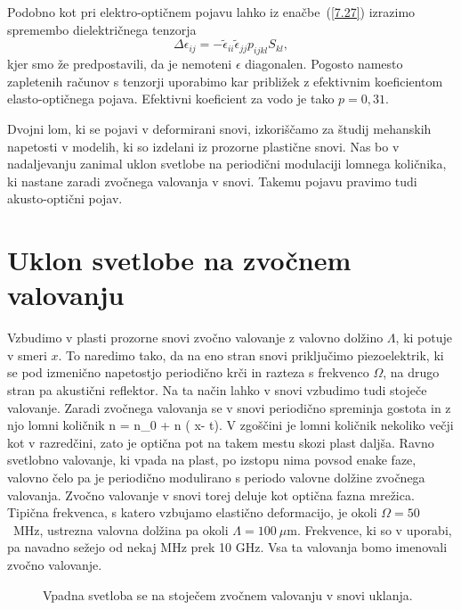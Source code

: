 Podobno kot pri elektro-optičnem pojavu lahko iz enačbe~(\ref{7.27}) izrazimo
spremembo dielektričnega tenzorja 
\begin{equation}
\Delta\epsilon_{ij}=-\tilde{\epsilon}_{ii}\tilde{\epsilon}_{jj}p_{ijkl}S_{kl},
\label{7.29}
\end{equation}
kjer smo že predpostavili, da je nemoteni $\epsilon$ diagonalen. Pogosto namesto zapletenih
računov s tenzorji uporabimo kar približek z efektivnim koeficientom elasto-optičnega pojava. 
Efektivni koeficient za vodo je tako $p = 0,31$.

Dvojni lom, ki se pojavi v deformirani snovi, izkoriščamo za študij
mehanskih napetosti v modelih, ki so izdelani iz prozorne plastične
snovi. Nas bo v nadaljevanju zanimal uklon svetlobe na periodični
modulaciji lomnega količnika, ki nastane zaradi zvočnega valovanja v snovi. Takemu pojavu
pravimo tudi akusto-optični pojav.

\section{Uklon svetlobe na zvočnem valovanju}

Vzbudimo v plasti prozorne snovi zvočno valovanje z valovno dolžino $\Lambda$, ki potuje v smeri $x$.
To naredimo tako, da na eno stran snovi priključimo piezoelektrik, 
ki se pod izmenično napetostjo periodično krči in razteza s frekvenco $\Omega$, 
na drugo stran pa akustični reflektor. Na ta način lahko v snovi vzbudimo tudi stoječe
valovanje. Zaradi zvočnega valovanja se v snovi periodično spreminja gostota in 
z njo lomni količnik
\beq
n = n_0 + \Delta n \sin \left(\frac{2\pi}{\Lambda} x- \Omega t\right).
\eeq
V zgoščini je lomni količnik nekoliko večji kot v razredčini, zato je optična pot na takem mestu
skozi plast daljša. Ravno svetlobno valovanje, ki vpada na plast, po
izstopu nima povsod enake faze, valovno čelo pa je periodično modulirano s periodo 
valovne dolžine zvočnega valovanja. Zvočno valovanje v snovi torej deluje kot 
optična fazna mrežica. Tipična frekvenca, s katero vzbujamo elastično
deformacijo, je okoli $\Omega=50$~MHz, ustrezna valovna dolžina pa okoli $\Lambda = 100~\mu$m. 
Frekvence, ki so v uporabi, pa navadno sežejo od nekaj MHz prek 10 GHz. Vsa ta valovanja bomo 
imenovali zvočno valovanje. 

\begin{figure}[h]
\centering
\def\svgwidth{70truemm} 

\caption{Vpadna svetloba se na stoječem zvočnem valovanju v snovi uklanja.}
\label{fig:ao}
\end{figure}

